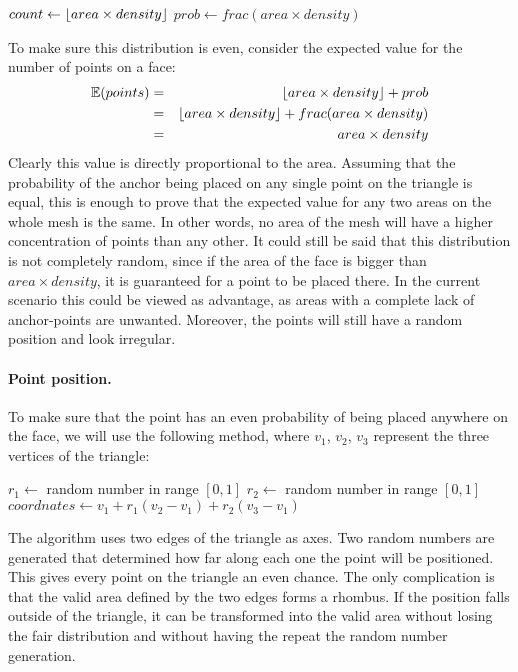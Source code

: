\documentclass[a4paper, 12pt]{article}
\DeclarePairedDelimiter{\floor}{\lfloor}{\rfloor}
\begin{document}
\begin{algorithm}[H]
$count \leftarrow \floor{area \times density}$\;
$prob \leftarrow frac(area \times density)$ 
\end{algorithm}

To make sure this distribution is even, consider the expected value for the number of points on a face:
\begin{eqnarray*}
\mathbb{E} (points) & = & \floor{area \times density} + prob \\
& = & \floor{area \times density} + frac(area \times density) \\
& = & area \times density
\end{eqnarray*}
Clearly this value is directly proportional to the area. Assuming that the probability of the anchor being placed on any single point on the triangle is equal, this is enough to prove that the expected value for any two areas on the whole mesh is the same. In other words, no area of the mesh will have a higher concentration of points than any other. It could still be said that this distribution is not completely random, since if the area of the face is bigger than $area \times density$, it is guaranteed for a point to be placed there. In the current scenario this could be viewed as advantage, as areas with a complete lack of anchor-points are unwanted. Moreover, the points will still have a random position and look irregular.

\paragraph{Point position.}
To make sure that the point has an even probability of being placed anywhere on the face, we will use the following method, where $v_1$, $v_2$, $v_3$ represent the three vertices of the triangle:

\begin{algorithm}[H]
$r_1 \leftarrow$ random number in range $[0,1]$\;
$r_2 \leftarrow$ random number in range $[0,1]$\;
$coordnates \leftarrow v_1 + r_1(v_2-v_1) + r_2(v_3-v_1)$
\end{algorithm}

The algorithm uses two edges of the triangle as axes. Two random numbers are generated that determined how far along each one the point will be positioned. This gives every point on the triangle an even chance. The only complication is that the valid area defined by the two edges forms a rhombus. If the position falls outside of the triangle, it can be transformed into the valid area without losing the fair distribution and without having the repeat the random number generation.
\end{document}
